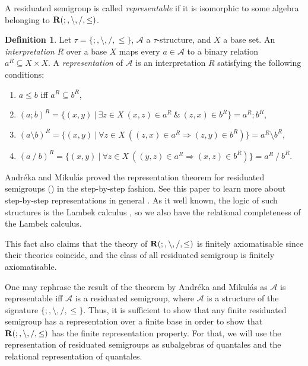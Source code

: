 \documentclass[a4paper]{article}
\theoremstyle{definition}
\newtheorem{definition}{Definition}
\theoremstyle{theorem}
\theoremstyle{proposition}
\theoremstyle{lemma}
\theoremstyle{ex}
\theoremstyle{corollary}
\theoremstyle{claim}
\begin{document}
A residuated semigroup is called \emph{representable} if it is isomorphic to some algebra belonging to ${\bf R}(;, \setminus, /, \leq)$.

\begin{definition}
  Let $\tau = \{ ;, \setminus, /, \leq \}$, $\mathcal{A}$ a $\tau$-structure, and $X$ a base set. An \emph{interpretation} $R$ over a base $X$ maps every $a \in \mathcal{A}$ to a binary relation $a^R \subseteq X \times X$. A \emph{representation} of $\mathcal{A}$ is an interpretation $R$ satisfying the following conditions:

  \begin{enumerate}
    \item $a \leq b$ iff $a^R \subseteq b^R$,
    \item $(a;b)^R = \{ (x, y) \: | \: \exists z \in X \: (x, z) \in a^R \: \& \: (z, x) \in b^R \} = a^R ; b^R$,
    \item $(a \setminus b)^{R} = \{ (x, y) \: | \: \forall z \in X \: ((z, x) \in a^R \Rightarrow (z, y) \in b^R)\} = a^R \setminus b^R$,
    \item $(a \: / \: b)^{R} = \{ (x, y) \: | \: \forall z \in X \: ((y, z) \in a^R \Rightarrow (x, z) \in b^R)\} = a^R \: / \: b^R$.
  \end{enumerate}
\end{definition}

 Andr\'{e}ka and Mikul\'{a}s proved the representation theorem for residuated semigroups (\cite{andreka1994lambek}) in the step-by-step fashion. See this paper to learn more about step-by-step representations in general \cite{hirsch1997step}. As it well known, the logic of such structures is the Lambek calculus \cite{lambek1958mathematics}, so we also have the relational completeness of the Lambek calculus.

This fact also claims that the theory of ${\bf R}(;, \setminus, /, \leq)$ is finitely axiomatisable since their theories coincide, and the class of all residuated semigroup is finitely axiomatisable.

One may rephrase the result of the theorem by Andr\'{e}ka and Mikul\'{a}s as $\mathcal{A}$ is representable iff $\mathcal{A}$ is a residuated semigroup, where $\mathcal{A}$ is a structure of the signature $\{ ;, \setminus, /, \leq \}$. Thus, it is sufficient to show that any finite residuated semigroup has a representation over a finite base in order to show that ${\bf R}(;, \setminus, /, \leq)$ has the finite representation property. For that, we will use the representation of residuated
semigroups as subalgebras of quantales and the relational representation of quantales.
\end{document}
